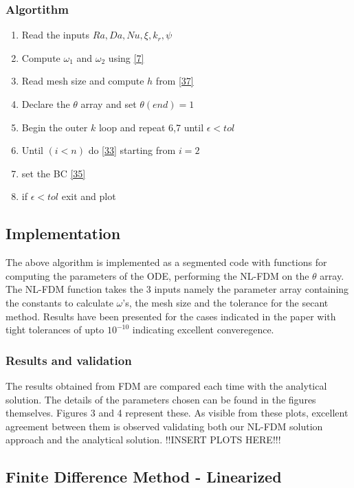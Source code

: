 \documentclass[12pt]{article}
\begin{document}
\subsubsection{Algortithm}
\begin{enumerate}
    \item Read the inputs $Ra, Da, Nu, \xi, k_r, \psi$
    \item Compute $\omega_1$ and $\omega_2$ using \eqref{7}
    \item Read mesh size and compute $h$ from \eqref{37}
    \item Declare the $\theta$ array and set $\theta(end)=1$
    \item Begin the outer $k$ loop and repeat 6,7 until $\epsilon<tol$
    \item Until $(i<n)$ do \eqref{33} starting from $i=2$
    \item set the BC \eqref{35}
    \item if $\epsilon<tol$ exit and plot
\end{enumerate}
\subsection{Implementation}
The above algorithm is implemented as a segmented code with functions for computing the parameters of the ODE, performing the NL-FDM on the $\theta$ array. The NL-FDM function takes the 3 inputs namely the parameter array containing the constants to calculate $\omega$'s, the mesh size and the tolerance for the secant method. Results have been presented for the cases indicated in the paper with tight tolerances of upto $10^{-10}$ indicating excellent converegence. 
\subsubsection{Results and validation}
The results obtained from FDM are compared each time with the analytical solution. The details of the parameters chosen can be found in the figures themselves. Figures 3 and 4 represent these. As visible from these plots, excellent agreement between them is observed validating both our NL-FDM solution approach and the analytical solution. !!INSERT PLOTS HERE!!!
\subsection{Finite Difference Method - Linearized}
\end{document}
